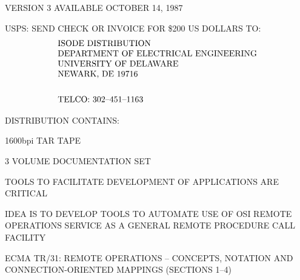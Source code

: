 \begin{bwslide}

\begin{nrtc}
\item	VERSION 3 AVAILABLE OCTOBER 14, 1987

\item	USPS: SEND CHECK OR INVOICE FOR \$200 US DOLLARS TO:
    \[\begin{tabular}{l}
	ISODE DISTRIBUTION\\
	DEPARTMENT OF ELECTRICAL ENGINEERING\\
	UNIVERSITY OF DELAWARE\\
	NEWARK, DE  19716\\[0.25in]
	TELCO: 302--451--1163
    \end{tabular}\]

\item	DISTRIBUTION CONTAINS:
    \begin{nrtc}
    \item	1600bpi TAR TAPE

    \item	3 VOLUME DOCUMENTATION SET
    \end{nrtc}
\end{nrtc}
\end{bwslide}


\begin{bwslide}

\begin{nrtc}
\item	TOOLS TO FACILITATE DEVELOPMENT OF APPLICATIONS ARE CRITICAL

\item	IDEA IS TO DEVELOP TOOLS TO AUTOMATE USE OF OSI REMOTE OPERATIONS
	SERVICE AS A GENERAL REMOTE PROCEDURE CALL FACILITY

\item	ECMA TR/31: REMOTE OPERATIONS -- CONCEPTS, NOTATION AND
	CONNECTION-ORIENTED MAPPINGS (SECTIONS 1--4)
\end{nrtc}
\end{bwslide}


